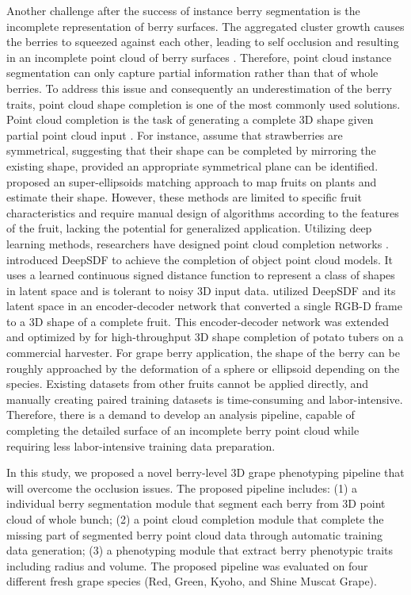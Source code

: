 \documentclass[12pt]{article}
\begin{document}
Another challenge after the success of instance berry segmentation is the incomplete representation of berry surfaces. 
The aggregated cluster growth causes the berries to squeezed against each other, leading to self occlusion and resulting in an incomplete point cloud of berry surfaces \citep{du_instance_2023}. 
Therefore, point cloud instance segmentation can only capture partial information rather than that of whole berries.
To address this issue and consequently an underestimation of the berry traits, point cloud shape completion is one of the most commonly used solutions.
Point cloud completion is the task of generating a complete 3D shape given partial point cloud input \citep{tesema_point_2024}. 
For instance, \citet{ge_symmetrybased_2020} assume that strawberries are symmetrical, suggesting that their shape can be completed by mirroring the existing shape, provided an appropriate symmetrical plane can be identified.
\citet{marangoz_fruit_2022} proposed an super-ellipsoids matching approach to map fruits on plants and estimate their shape.
However, these methods are limited to specific fruit characteristics and require manual design of algorithms according to the features of the fruit, lacking the potential for generalized application.
Utilizing deep learning methods, researchers have designed point cloud completion networks \citep{wang_unsupervised_2021}. 
\citet{park_deepsdf_2019} introduced DeepSDF to achieve the completion of object point cloud models. It uses a learned continuous signed distance function to represent a class of shapes in latent space and is tolerant to noisy 3D input data. 
\citet{magistri_contrastive_2022} utilized DeepSDF and its latent space in an encoder-decoder network that converted a single RGB-D frame to a 3D shape of a complete fruit. 
This encoder-decoder network was extended and optimized by \citet{blok_highthroughput_2025} for high-throughput 3D shape completion of potato tubers on a commercial harvester. 
For grape berry application, the shape of the berry can be roughly approached by the deformation of a sphere or ellipsoid depending on the species. 
Existing datasets from other fruits cannot be applied directly, and manually creating paired training datasets is time-consuming and labor-intensive.
Therefore, there is a demand to develop an analysis pipeline, capable of completing the detailed surface of an incomplete berry point cloud while requiring less labor-intensive training data preparation.

In this study, we proposed a novel berry-level 3D grape phenotyping pipeline that will overcome the occlusion issues. 
The proposed pipeline includes: 
(1) a individual berry segmentation module that segment each berry from 3D point cloud of whole bunch; 
(2) a point cloud completion module that complete the missing part of segmented berry point cloud data through automatic training data generation; 
(3) a phenotyping module that extract berry phenotypic traits including radius and volume. 
The proposed pipeline was evaluated on four different fresh grape species (Red, Green, Kyoho, and Shine Muscat Grape).
\end{document}
